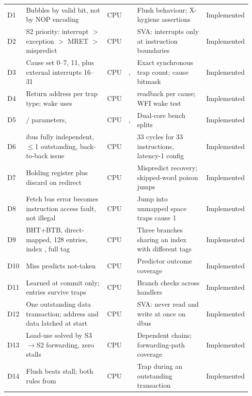 \begin{landscape}
\begin{longtable}{@{}lL{60mm}lL{44mm}L{40mm}l@{}}
D1 & Bubbles by valid bit, not by NOP encoding & CPU &  & Flush behaviour; X-hygiene assertions & Implemented \\
D2 & S2 priority: interrupt $>$ exception $>$ MRET $>$ mispredict & CPU &  & SVA: interrupts only at instruction boundaries & Implemented \\
D3 & Cause set 0--7, 11, plus external interrupts 16--31 & CPU & ,  & Exact synchronous trap count; cause bitmask & Implemented \\
D4 & Return address per trap type;  wake uses  & CPU &  &  readback per cause; WFI wake test & Implemented \\
D5 &  /  parameters,  & CPU & ,  & Dual-core bench splits  & Implemented \\
D6 & ibus fully independent, $\le$1 outstanding, back-to-back issue & CPU &  & 33 cycles for 33 instructions, latency-1 config & Implemented \\
D7 & Holding register plus discard on redirect & CPU &  & Mispredict recovery; skipped-word poison jumps & Implemented \\
D8 & Fetch bus error becomes instruction access fault, not illegal & CPU &  & Jump into unmapped space traps cause 1 & Implemented \\
D9 & BHT+BTB, direct-mapped, 128 entries, index , full tag & CPU &  & Three branches sharing an index with different tags & Implemented \\
D10 & Miss predicts not-taken & CPU &  & Predictor outcome coverage & Implemented \\
D11 & Learned at commit only; entries survive traps & CPU &  & Branch checks across handlers & Implemented \\
D12 & One outstanding data transaction; address and data latched at start & CPU &  & SVA: never read and write at once on dbus & Implemented \\
D13 & Load-use solved by S3$\to$S2 forwarding, zero stalls & CPU &  & Dependent chains; forwarding-path coverage & Implemented \\
D14 & Flush beats stall; both rules from  & CPU &  & Trap during an outstanding transaction & Implemented \\

\end{longtable}
\end{landscape}
